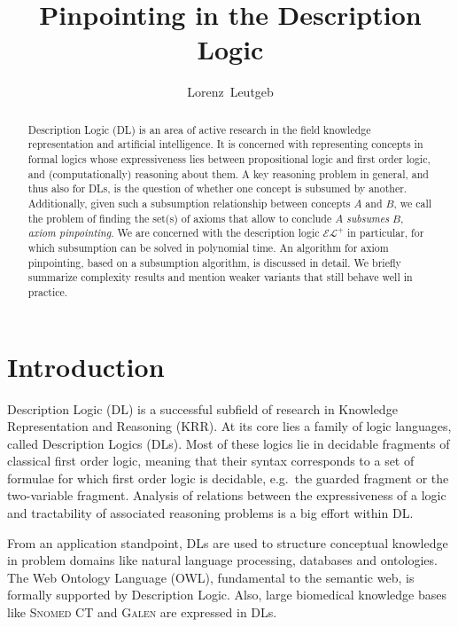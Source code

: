 \documentclass{llncs}
\title{Pinpointing in the Description Logic \texorpdfstring{\elp}{EL+}}
\author{Lorenz~Leutgeb}
\institute{International Center for Computational Logic, TU Dresden\\ \email{lorenz.leutgeb@mailbox.tu-dresden.de}}
\newcommand{\elp}{\ensuremath{\mathcal{EL^+}}\xspace}
\newcommand{\snomed}{\textsc{Snomed CT}\xspace}
\newcommand{\galen}{\textsc{Galen}\xspace}
\begin{document}
\maketitle

\begin{abstract}
Description Logic (DL) is an area of active research in the field knowledge representation and artificial intelligence. It is concerned with representing concepts in formal logics whose expressiveness lies between propositional logic and first order logic, and (computationally) reasoning about them.
A key reasoning problem in general, and thus also for DLs, is the question of whether one concept is subsumed by another. Additionally, given such a subsumption relationship between concepts $A$ and $B$, we call the problem of finding the set(s) of axioms that allow to conclude $A$ \emph{subsumes} $B$, \emph{axiom pinpointing}.
We are concerned with the description logic \elp in particular, for which subsumption can be solved in polynomial time. An algorithm for axiom pinpointing, based on a subsumption algorithm, is discussed
in detail. We briefly summarize complexity results and mention weaker variants that still behave well in practice.
\end{abstract}

\section{Introduction}
\label{sec:intro}

Description Logic (DL) is a successful subfield of research in Knowledge Representation and Reasoning (KRR). At its core lies a family of logic languages, called Description Logics  (DLs). Most of these logics lie in decidable fragments of classical first order logic, meaning that their syntax corresponds to a set of formulae for which first order logic is decidable, e.g.~the guarded fragment or the two-variable fragment. Analysis of relations between the expressiveness of a logic and tractability of associated reasoning problems is a big effort within DL.

From an application standpoint, DLs are used to structure conceptual knowledge in problem domains like natural language processing, databases and ontologies. The Web Ontology Language (OWL), fundamental to the semantic web, is formally supported by Description Logic. Also, large biomedical knowledge bases like \snomed and \galen are expressed in DLs.
\end{document}
